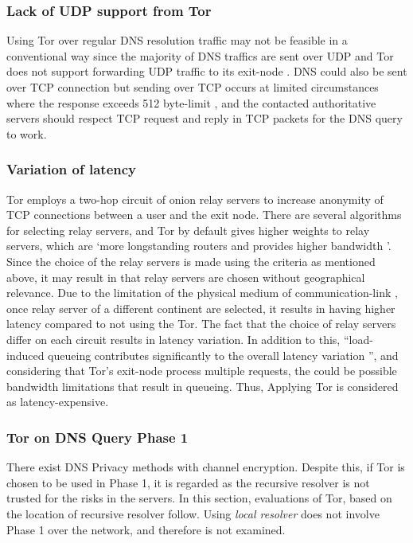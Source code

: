 \subsubsection{Lack of UDP support from Tor}\label{no-udp-tor}
Using Tor over regular DNS resolution traffic may not be feasible in a conventional way since the majority of DNS traffics are sent over UDP and Tor does not support forwarding UDP traffic to its exit-node \cite{udp-over-tor, dingledine2004tor}.
DNS could also be sent over TCP connection but sending over TCP occurs at limited circumstances where the response exceeds 512 byte-limit \cite{rfc7766}, and the contacted authoritative servers should respect TCP request and reply in TCP packets for the DNS query to work.

\subsubsection{Variation of latency}
Tor employs a two-hop circuit of onion relay servers to increase anonymity of TCP connections between a user and the exit node.
There are several algorithms for selecting relay servers, and Tor by default gives higher weights to relay servers, which are `more longstanding routers and provides higher bandwidth \cite{wacek2013empirical}'.
Since the choice of the relay servers is made using the criteria as mentioned above, it may result in that relay servers are chosen without geographical relevance.
Due to the limitation of the physical medium of communication-link \cite{Singla:2014:ISL}, once relay server of a different continent are selected, it results in having higher latency compared to not using the Tor.
The fact that the choice of relay servers differ on each circuit results in latency variation. In addition to this, ``load-induced queueing contributes significantly to the overall latency variation \cite{Hoiland-Jorgensen:2016}'', and considering that Tor's exit-node process multiple requests, the could be possible bandwidth limitations that result in queueing.
Thus, Applying Tor is considered as latency-expensive.

\subsubsection{Tor on DNS Query Phase 1}
There exist DNS Privacy methods with channel encryption. Despite this, if Tor is chosen to be used in Phase 1, it is regarded as the recursive resolver is not trusted for the risks in the servers.
In this section, evaluations of Tor, based on the location of recursive resolver follow. Using \textit{local resolver} does not involve Phase 1 over the network, and therefore is not examined.


